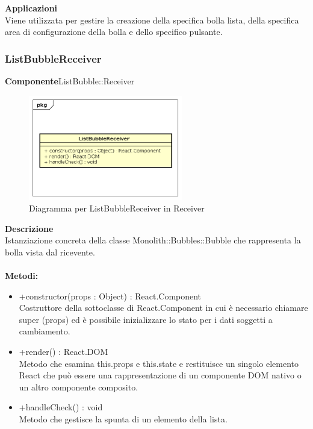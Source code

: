 \textbf{Applicazioni}\\
Viene utilizzata per gestire la creazione della specifica bolla lista, della specifica area di configurazione della bolla e dello specifico pulsante. 


\clearpage

\subsubsection{ListBubbleReceiver}
\textbf{Componente}ListBubble::Receiver\\
   \FloatBarrier
   \begin{figure}[ht]
   \centering
   \includegraphics[width=0.6\textwidth]{img/single-ListBubbleReceiver}
   \caption{{Diagramma per ListBubbleReceiver in Receiver}}
\end{figure}
\FloatBarrier
\textbf{Descrizione}\\
Istanziazione concreta della classe Monolith::Bubbles::Bubble che rappresenta la bolla vista dal ricevente.
\\
\\
\textbf{Metodi:} 
\begin{itemize}
\item +constructor(props : Object) : React.Component 
\\
Costruttore della sottoclasse di React.Component in cui è necessario chiamare super (props) ed è possibile inizializzare lo stato per i dati soggetti a cambiamento.

\item +render() : React.DOM 
\\
Metodo che esamina this.props e this.state e restituisce un singolo elemento React che può essere una rappresentazione di un componente DOM nativo o un altro componente composito.

\item +handleCheck() : void 
\\
Metodo che gestisce la spunta di un elemento della lista.
\end{itemize} 


